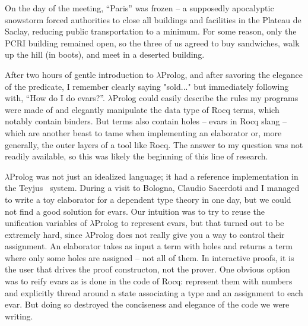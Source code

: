 \documentclass{these-ISSS}
\begin{document}
On the day of the meeting, ``Paris'' was frozen -- a supposedly apocalyptic snowstorm forced
authorities to close all buildings and facilities in the Plateau de Saclay,
reducing public transportation
to a minimum. For some reason, only the PCRI building remained open, so the
three of us agreed to buy sandwiches, walk up the hill (in boots), and meet in
a deserted building.

After two hours of gentle introduction to $\lambda$Prolog, and after savoring
the elegance of the  predicate, I remember clearly saying "sold..."
but immediately following with, ``How do I do evars?''. $\lambda$Prolog could
easily describe the rules my programs were made of and elegantly manipulate the
data type of Rocq terms, which notably contain binders. But terms also contain
holes -- evars in Rocq slang -- which are another beast to tame when implementing an
elaborator or, more generally, the outer layers of a tool like Rocq. The answer
to my question was not readily available, so this was likely the beginning of
this line of research.

$\lambda$Prolog was not just an idealized language; it had a reference
implementation in the Teyjus~\cite{teyjus} system. During a visit to Bologna,
Claudio Sacerdoti and I managed to write a toy elaborator for a dependent type
theory in one day, but we could not find a good solution for evars. Our
intuition was to try to reuse the unification variables of $\lambda$Prolog to
represent evars, but that turned out to be extremely hard, since $\lambda$Prolog
does not really give you a way to control their assignment. An elaborator takes
as input a term with holes and returns a term where only some holes are
assigned -- not all of them. In interactive proofs, it is the user
that drives the proof constructon, not the prover.
One obvious option was to reify evars as is done in
the code of Rocq: represent them with numbers and explicitly thread around a
state associating a type and an assignment to each evar. But doing so destroyed
the conciseness and elegance of the code we were writing.
\end{document}
